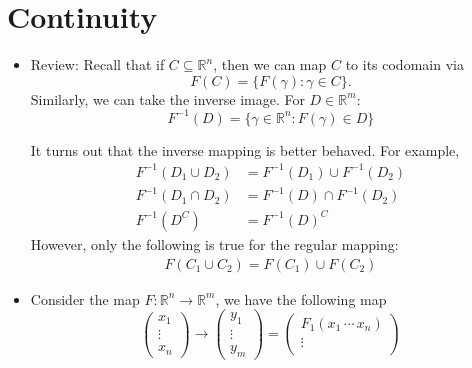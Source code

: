 \section{Continuity}
\begin{itemize}
    \item Review: Recall that if $C \subseteq \mathbb{R}^n$, then we can map $C$ to its codomain via
          \begin{equation}
              F(C) = \{F(\gamma):\gamma \in C\}.
          \end{equation}
          Similarly, we can take the inverse image. For $D\in \mathbb{R}^m$:
          \begin{equation}
              F^{-1}(D) = \{\gamma \in \mathbb{R}^n: F(\gamma)\in D\}
          \end{equation}
          \begin{idea}
              It turns out that the inverse mapping is better behaved. For example,
              \begin{align}
                  F^{-1}(D_1 \cup D_2) & = F^{-1}(D_1) \cup F^{-1}(D_2) \\
                  F^{-1}(D_1 \cap D_2) & = F^{-1}(D) \cap F^{-1}(D_2)   \\
                  F^{-1}(D^C)          & = F^{-1}(D)^C
              \end{align}
              However, only the following is true for the regular mapping:
              \begin{align}
                  F(C_1 \cup C_2) = F(C_1) \cup F(C_2)
              \end{align}
          \end{idea}
    \item Consider the map $F: \mathbb{R}^n \rightarrow \mathbb{R}^m$, we have the following map
          \begin{equation}
              \begin{pmatrix}
                  x_1 \\ \vdots \\ x_n
              \end{pmatrix}\rightarrow \begin{pmatrix}
                  y_1 \\ \vdots \\ y_m
              \end{pmatrix} = \begin{pmatrix}
                  F_1(x_1\,\cdots\,x_n) \\
                  \vdots                \\

\end{pmatrix}
\end{equation}
\end{itemize}
